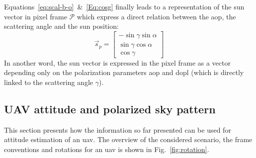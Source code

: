 Equations~\ref{eq:scal-b-o}~\&~\ref{Eq:cosg} finally leads to a representation of the sun vector
in pixel frame $\mathcal{P}$ which express a direct relation between the
\gls{aop}, the scattering angle and the sun position:
\begin{equation}
  \label{eq:sunp}
  \vec{s}_{p} =
    \begin{bmatrix}
    -\sin\gamma \sin\alpha\\
    \sin\gamma \cos\alpha\\
    \cos\gamma
  \end{bmatrix}
\end{equation}
In another word, the sun vector is expressed in the pixel frame as a vector depending only on the polarization parameters \gls{aop} and \gls{dopl} (which is directly linked to the scattering angle $\gamma$).

\subsection{UAV attitude and polarized sky pattern}
\label{subsec:ps-attitude}
This section presents how the information so far presented can be used for
attitude estimation of an \gls{uav}.
The overview of the considered scenario, the frame conventions and rotations
for an \gls{uav} is shown in Fig.~\ref{fig:rotation}.

